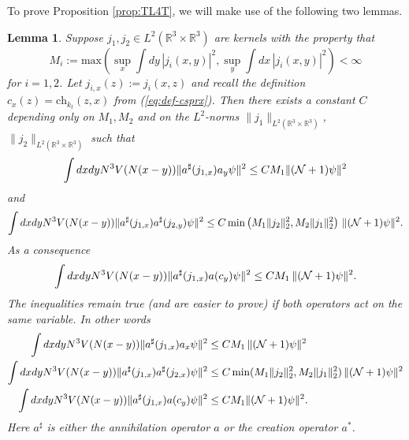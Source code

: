 \documentclass[11pt,a4paper]{article}
\newtheorem{lemma}[thm]{Lemma}
\newcommand{\bR}{{\mathbb R}}
\newcommand{\cN}{{\cal N}}
\begin{document}
To prove Proposition \ref{prop:TL4T}, we will make use of the following two lemmas.
\begin{lemma}\label{lm:4}
Suppose $j_1, j_2 \in L^2 (\bR^3 \times \bR^3)$ are kernels with the property that 
\[ M_i  := \text{max} \left( \sup_x \int dy \, |j_i (x,y)|^2 , \sup_y \int dx \, |j_i (x,y)|^2 \right) < \infty \]
for $i =1 ,2$. Let $j_{i,x} (z) := j_i (x,z)$ and recall the definition $c_x
(z) = \text{ch}_{k_t} (z,x)$ from (\ref{eq:def-csprx}). Then there exists a
constant $C$ depending only on $M_1, M_2$ and on the $L^2$-norms $\| j_1
\|_{L^2 (\bR^3 \times \bR^3)}$, $\| j_2 \|_{L^2 (\bR^3 \times \bR^3)}$ such that
\begin{equation}\label{eq:lm4-1}
\int dx dy N^3 V (N (x-y)) \| a^\sharp (j_{1,x}) a_y \psi \|^2 \leq C M_1 \| (\cN+1) \psi \|^2
\end{equation}
and 
\begin{equation}\label{eq:lm4-2}
\int dx dy N^3 V(N (x-y)) \| a^\sharp (j_{1,x}) a^\sharp (j_{2,y}) \psi \|^2 \leq C \min \left(M_1 \| j_2 \|^2_2 , M_2 \| j_1 \|_2^2 \right) \, \| (\cN+1) \psi \|^2 .
\end{equation}
As a consequence
\begin{equation}\label{eq:lm4-3}
\int dx dy N^3 V (N (x-y)) \| a^\sharp (j_{1,x}) a (c_y) \psi \|^2 \leq C M_1 \, \| (\cN+1) \psi \|^2. \end{equation}
The inequalities remain true (and are easier to prove) if both operators act on the same variable. In other words
\begin{equation}\label{eq:lm4-4}
\begin{split}
\int dx dy N^3 V (N (x-y)) \| a^\sharp (j_{1,x}) a_x \psi \|^2 &\leq C M_1 \, \| (\cN+1) \psi \|^2 \\
\int dx dy N^3 V(N (x-y)) \| a^\sharp (j_{1,x}) a^\sharp (j_{2,x}) \psi \|^2 &\leq C \min (M_1 \|j_2 \|_2^2 , M_2 \|j_1\|_2^2 ) \, \| (\cN+1) \psi \|^2 \\
\int dx dy N^3 V (N (x-y)) \| a^\sharp (j_{1,x}) a (c_y) \psi \|^2 &\leq C M_1  \| (\cN+1) \psi \|^2.
\end{split}
\end{equation}
Here $a^\sharp$ is either the annihilation operator $a$ or the creation operator $a^*$. 
\end{lemma}
\end{document}
